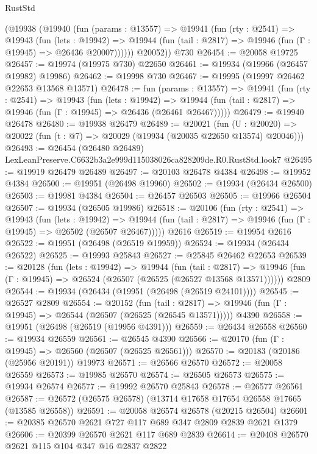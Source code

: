 \begin{lexlean}{RustStd}
\begin{coremodule}
      (@19938
        (@19940
          (fun (params : @13557) =>
          @19941
            (fun (rty : @2541) =>
            @19943
              (fun (lets : @19942) =>
              @19944 (fun (tail : @2817) => @19946 (fun (Γ : @19945) => @26436 @20007))))))
        @20052))
    @730
@26454 := @20058 @19725
@26457 := @19974 (@19975 @730) @22650
@26461 := @19934 (@19966 (@26457 @19982) @19986)
@26462 := @19998 @730
@26467 := @19995 (@19997 @26462 @22653 @13568 @13571)
@26478 := fun (params : @13557) =>
  @19941
    (fun (rty : @2541) =>
    @19943
      (fun (lets : @19942) =>
      @19944 (fun (tail : @2817) => @19946 (fun (Γ : @19945) => @26436 (@26461 @26467)))))
@26479 := @19940 @26478
@26480 := @19938 @26479
@26489 := @20021
    (fun (U : @20020) => @20022 (fun (t : @7) => @20029 (@19934 (@20035 @22650 @13574) @20046)))
@26493 := @26454 (@26480 @26489) LexLeanPreserve.C6632b3a2e999d115038026ca828209de.R0.RustStd.look7
@26495 := @19919 @26479 @26489
@26497 := @20103 @26478 @4384
@26498 := @19952 @4384
@26500 := @19951 (@26498 @19960)
@26502 := @19934 (@26434 @26500)
@26503 := @19981 @4384
@26504 := @26457 @26503
@26505 := @19966 @26504
@26507 := @19934 (@26505 @19986)
@26518 := @20106
    (fun (rty : @2541) =>
    @19943
      (fun (lets : @19942) =>
      @19944 (fun (tail : @2817) => @19946 (fun (Γ : @19945) => @26502 (@26507 @26467)))))
    @2616
@26519 := @19954 @2616
@26522 := @19951 (@26498 (@26519 @19959))
@26524 := @19934 (@26434 @26522)
@26525 := @19993 @25843
@26527 := @25845 @26462 @22653
@26539 := @20128
    (fun (lets : @19942) =>
    @19944
      (fun (tail : @2817) =>
      @19946 (fun (Γ : @19945) => @26524 (@26507 (@26525 (@26527 @13568 @13571))))))
    @2809
@26544 := @19934 (@26434 (@19951 (@26498 (@26519 @24101))))
@26545 := @26527 @2809
@26554 := @20152
    (fun (tail : @2817) => @19946 (fun (Γ : @19945) => @26544 (@26507 (@26525 (@26545 @13571)))))
    @4390
@26558 := @19951 (@26498 (@26519 (@19956 @4391)))
@26559 := @26434 @26558
@26560 := @19934 @26559
@26561 := @26545 @4390
@26566 := @20170 (fun (Γ : @19945) => @26560 (@26507 (@26525 @26561)))
@26570 := @20183 (@20186 (@25956 @20191)) @19973
@26571 := @26566 @26570
@26572 := @20058 @26559
@26573 := @19985 @26570
@26574 := @26505 @26573
@26575 := @19934 @26574
@26577 := @19992 @26570 @25843
@26578 := @26577 @26561
@26587 := @26572 (@26575 @26578) (@13714 @17658 @17654 @26558 @17665 (@13585 @26558))
@26591 := @20058 @26574 @26578 (@20215 @26504)
@26601 := @20385 @26570 @2621 @727 @117 @689 @347 @2809 @2839 @2621 @1379
@26606 := @20399 @26570 @2621 @117 @689 @2839
@26614 := @20408 @26570 @2621 @115 @104 @347 @16 @2837 @2822

\end{coremodule}
\end{lexlean}
